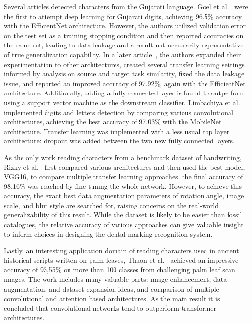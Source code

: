 \documentclass[english,twoside,openright]{UH_DS_MSc}
\begin{document}
Several articles detected characters from the Gujarati language.
Goel et al.~\cite{10goelGujarati} were the first to attempt deep learning for Gujarati digits, 
achieving 96.5\% accuracy with the EfficientNet architecture. However, the authors utilized 
validation error on the test set as a training stopping condition and then reported accuracies 
on the same set, leading to data leakage and a result not necessarily representative of true
generalization capability. In a later article~\cite{8goelGujarati2023}, the authors expanded 
their experimentation to other architectures, created several transfer learning settings informed 
by analysis on source and target task similarity, fixed the data leakage issue, and reported an 
improved accuracy of 97.92\%, again with the EfficientNet architecture. Additionally, adding a fully
connected layer is found to outperform using a support vector machine as the downstream classifier.
Limbachiya et al.~\cite{2limbachiyaGujarati} implemented digits and letters detection by comparing various convolutional architectures,
 achieving the best accuracy of 97.03\% with the MobileNet architecture. Transfer learning was implemented with a
  less usual top layer architecture: dropout was added between the two new fully connected layers.

As the only work reading characters from a benchmark dataset of handwriting, Rizky et al.~\cite{7rizkybasicCnnTransfer}
first compared various architectures and then used the best model, VGG16, to compare multiple transfer learning 
approaches. the final accuracy of 98.16\% was reached by fine-tuning the whole network. However, to achieve this accuracy, the exact best data augmentation parameters of 
rotation angle, image scale, and blur style are searched for, raising concerns on the real-world generalizability of this result.
 While the dataset is likely to be easier than fossil catalogues, the relative accuracy of
various approaches can give valuable insight to inform choices in designing the dental marking recognition system.

Lastly, an interesting application domain of reading characters used in ancient historical scripts written 
on palm leaves, Thuon et al.~\cite{9thuonPalm} achieved an impressive accuracy of 93,55\% on more than 100 
classes from challenging palm leaf scan images. The work includes many valuable parts: image enhancement,
data augmentation, and dataset expansion ideas, and comparison of multiple convolutional and attention based 
architectures. As the main result it is concluded that convolutional networks tend to outperform transformer architectures.
\end{document}
